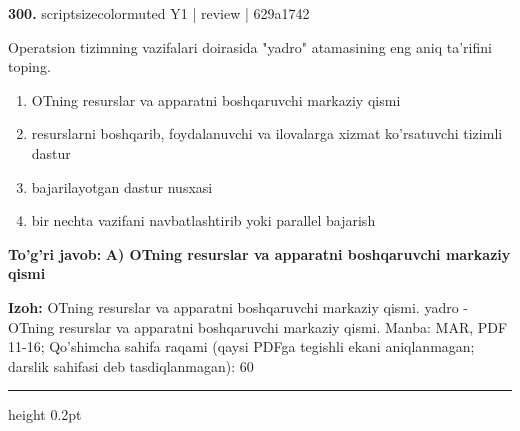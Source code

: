 \documentclass[10pt,a4paper]{article}
\begin{document}
{\bfseries\sffamily\color{ink} 300.} {scriptsizecolor{muted} Y1 | review | 629a1742}
\par
Operatsion tizimning vazifalari doirasida "yadro" atamasining eng aniq ta'rifini toping.
\begin{enumerate}[label=\Alph*),leftmargin=9mm]
\item OTning resurslar va apparatni boshqaruvchi markaziy qismi
\item resurslarni boshqarib, foydalanuvchi va ilovalarga xizmat ko'rsatuvchi tizimli dastur
\item bajarilayotgan dastur nusxasi
\item bir nechta vazifani navbatlashtirib yoki parallel bajarish
\end{enumerate}
\begin{tcolorbox}[enhanced,breakable,colback=teal!4,colframe=teal!60!black,boxrule=0.45pt,arc=1.2mm,left=2.7mm,right=2.7mm,top=1.8mm,bottom=1.8mm,before skip=2mm,after skip=2mm]
{\bfseries\sffamily\color{teal}To'g'ri javob:} \textbf{A) OTning resurslar va apparatni boshqaruvchi markaziy qismi}
\par\smallskip
{\bfseries Izoh:} OTning resurslar va apparatni boshqaruvchi markaziy qismi. yadro - OTning resurslar va apparatni boshqaruvchi markaziy qismi. Manba: MAR, PDF 11-16; Qo'shimcha sahifa raqami (qaysi PDFga tegishli ekani aniqlanmagan; darslik sahifasi deb tasdiqlanmagan): 60
\end{tcolorbox}
\vspace{2mm}\hrule height 0.2pt\vspace{3mm}
\end{document}
